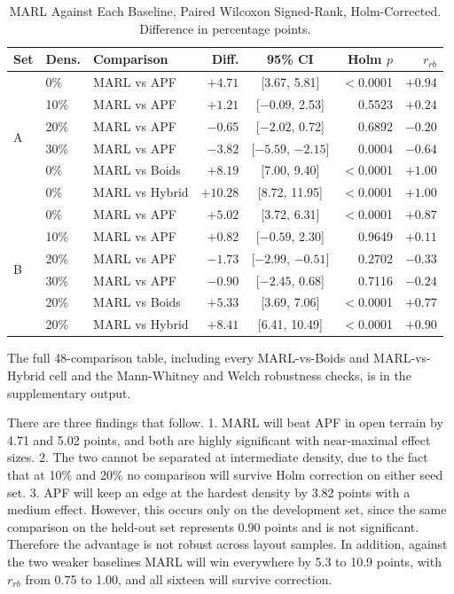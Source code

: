 \documentclass[a4paper, 10pt, conference]{ieeeconf}
\begin{document}
\begin{table}[htb]
\centering
\caption{MARL Against Each Baseline, Paired Wilcoxon Signed-Rank,
Holm-Corrected. Difference in percentage points.}
\label{tab:stats}
\scriptsize
\setlength{\tabcolsep}{1.6pt}
\begin{tabular}{lllrcrr}
\toprule
\textbf{Set} & \textbf{Dens.} & \textbf{Comparison} & \textbf{Diff.} &
\textbf{95\% CI} & \textbf{Holm $p$} & \textbf{$r_{rb}$} \\
\midrule
\multirow{6}{*}{A}
& 0\%  & MARL vs APF    & $+4.71$  & [3.67, 5.81]        & $<$0.0001 & $+0.94$ \\
& 10\% & MARL vs APF    & $+1.21$  & [$-0.09$, 2.53]     & 0.5523    & $+0.24$ \\
& 20\% & MARL vs APF    & $-0.65$  & [$-2.02$, 0.72]     & 0.6892    & $-0.20$ \\
& 30\% & MARL vs APF    & $-3.82$  & [$-5.59$, $-2.15$]  & 0.0004    & $-0.64$ \\
& 0\%  & MARL vs Boids  & $+8.19$  & [7.00, 9.40]        & $<$0.0001 & $+1.00$ \\
& 0\%  & MARL vs Hybrid & $+10.28$ & [8.72, 11.95]       & $<$0.0001 & $+1.00$ \\
\midrule
\multirow{6}{*}{B}
& 0\%  & MARL vs APF    & $+5.02$  & [3.72, 6.31]        & $<$0.0001 & $+0.87$ \\
& 10\% & MARL vs APF    & $+0.82$  & [$-0.59$, 2.30]     & 0.9649    & $+0.11$ \\
& 20\% & MARL vs APF    & $-1.73$  & [$-2.99$, $-0.51$]  & 0.2702    & $-0.33$ \\
& 30\% & MARL vs APF    & $-0.90$  & [$-2.45$, 0.68]     & 0.7116    & $-0.24$ \\
& 20\% & MARL vs Boids  & $+5.33$  & [3.69, 7.06]        & $<$0.0001 & $+0.77$ \\
& 20\% & MARL vs Hybrid & $+8.41$  & [6.41, 10.49]       & $<$0.0001 & $+0.90$ \\
\bottomrule
\end{tabular}

\vspace{0.3em}
{\footnotesize The full 48-comparison table, including every
MARL-vs-Boids and MARL-vs-Hybrid cell and the Mann-Whitney and Welch
robustness checks, is in the supplementary output.}
\end{table}

There are three findings that follow. 1. MARL will beat APF in open
terrain by 4.71 and 5.02 points, and both are highly significant with
near-maximal effect sizes. 2. The two cannot be separated at
intermediate density, due to the fact that at 10\% and 20\% no
comparison will survive Holm correction on either seed set. 3. APF
will keep an edge at the hardest density by 3.82 points with a medium
effect. However, this occurs only on the development set, since the
same comparison on the held-out set represents 0.90 points and is not
significant. Therefore the advantage is not robust across layout
samples. In addition, against the two weaker baselines MARL will win
everywhere by 5.3 to 10.9 points, with $r_{rb}$ from 0.75 to 1.00, and
all sixteen will survive correction.
\end{document}
